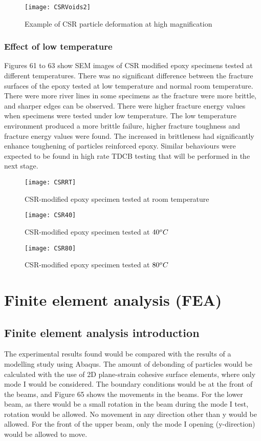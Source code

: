 \documentclass[numbers=noendperiod,chapterprefix=on]{icldt} %
\begin{document}
\begin{figure}[!htpb]
\centering
\texttt{[image: CSRVoids2]}
\caption{Example of CSR particle deformation at high magnification }
\end{figure}
\FloatBarrier

\subsubsection{Effect of low temperature}
Figures 61 to 63 show SEM images of CSR modified epoxy specimens tested at different temperatures. There was no significant difference between the fracture surfaces of the epoxy tested at low temperature and normal room temperature. There were more river lines in some specimens as the fracture were more brittle, and sharper edges can be observed. There were higher fracture energy values when specimens were tested under low temperature. The low temperature environment produced a more brittle failure, higher fracture toughness and fracture energy values were found. The increased in brittleness had significantly enhance toughening of particles reinforced epoxy. Similar behaviours were expected to be found in high rate TDCB testing that will be performed in the next stage. 

\begin{figure}[!htpb]
\centering
\texttt{[image: CSRRT]}
\caption{CSR-modified epoxy specimen tested at room temperature }
\end{figure}
\FloatBarrier

\begin{figure}[!htpb]
\centering
\texttt{[image: CSR40]}
\caption{CSR-modified epoxy specimen tested at $\-40 ^oC$}
\end{figure}
\FloatBarrier

\begin{figure}[!htpb]
\centering
\texttt{[image: CSR80]}
\caption{CSR-modified epoxy specimen tested at  $\-80 ^oC$}
\end{figure}
\FloatBarrier

\section{Finite element analysis (FEA)}
\subsection{Finite element analysis introduction}
The experimental results found would be compared with the results of a modelling study using Abaqus. The amount of debonding of particles would be calculated with the use of 2D plane-strain cohesive surface elements, where only mode I would be considered. The boundary conditions would be at the front of the beams, and Figure 65 shows the movements in the beams. For the lower beam, as there would be a small rotation in the beam during the mode I test, rotation would be allowed. No movement in any direction other than y would be allowed. For the front of the upper beam, only the mode I opening (y-direction) would be allowed to move. 
\end{document}
